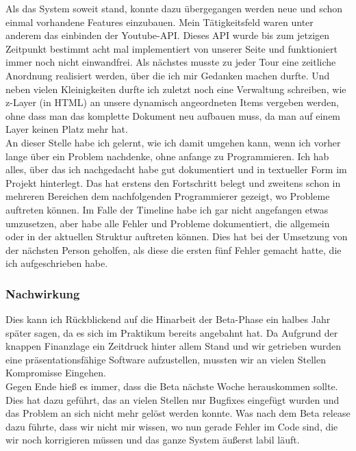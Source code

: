 Als das System soweit stand, konnte dazu übergegangen werden neue und schon einmal vorhandene Features einzubauen. Mein Tätigkeitsfeld waren unter anderem das einbinden der Youtube-API. Dieses API wurde bis zum jetzigen Zeitpunkt bestimmt acht mal implementiert von unserer Seite und funktioniert immer noch nicht einwandfrei. Als nächstes musste zu jeder Tour eine zeitliche Anordnung realisiert werden, über die ich mir Gedanken machen durfte. Und neben vielen Kleinigkeiten durfte ich zuletzt noch eine Verwaltung schreiben, wie z-Layer (in HTML) an unsere dynamisch angeordneten Items vergeben werden, ohne dass man das komplette Dokument neu aufbauen muss, da man auf einem Layer keinen Platz mehr hat.\\

An dieser Stelle habe ich gelernt, wie ich damit umgehen kann, wenn ich vorher lange über ein Problem nachdenke, ohne anfange zu Programmieren. Ich hab alles, über das ich nachgedacht habe gut dokumentiert und in textueller Form im Projekt hinterlegt. Das hat erstens den Fortschritt belegt und zweitens schon in mehreren Bereichen dem nachfolgenden Programmierer gezeigt, wo Probleme auftreten können. Im Falle der Timeline habe ich gar nicht angefangen etwas umzusetzen, aber habe alle Fehler und Probleme dokumentiert, die allgemein oder in der aktuellen Struktur auftreten können. Dies hat bei der Umsetzung von der nächsten Person geholfen, als diese die ersten fünf Fehler gemacht hatte, die ich aufgeschrieben habe.\\

\subsubsection{Nachwirkung}

Dies kann ich Rückblickend auf die Hinarbeit der Beta-Phase ein halbes Jahr später sagen, da es sich im Praktikum bereits angebahnt hat. Da Aufgrund der knappen Finanzlage ein Zeitdruck hinter allem Stand und wir getrieben wurden eine präsentationsfähige Software aufzustellen, mussten wir an vielen Stellen Kompromisse Eingehen.\\
Gegen Ende hieß es immer, dass die Beta nächste Woche herauskommen sollte. Dies hat dazu geführt, das an vielen Stellen nur Bugfixes eingefügt wurden und das Problem an sich nicht mehr gelöst werden konnte. Was nach dem Beta release dazu führte, dass wir nicht mir wissen, wo nun gerade Fehler im Code sind, die wir noch korrigieren müssen und das ganze System äußerst labil läuft.\\

